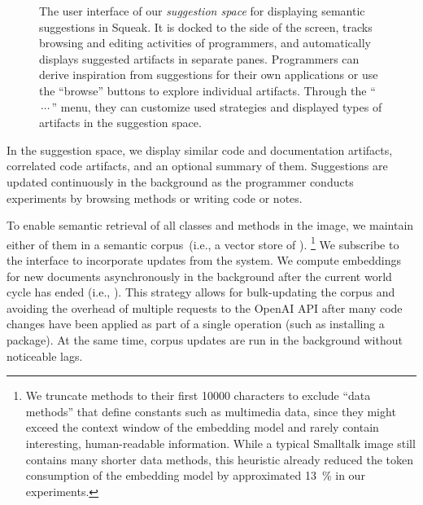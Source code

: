 \begin{figure}
	\caption[The user interface of our \emph{suggestion space} for displaying semantic suggestions in Squeak.]{
		The user interface of our \emph{suggestion space} for displaying semantic suggestions in Squeak.
		It is docked to the side of the screen, tracks browsing and editing activities of programmers, and automatically displays suggested artifacts in separate panes.
		Programmers can derive inspiration from suggestions for their own applications or use the ``browse'' buttons to explore individual artifacts.
		Through the ``$\,{\cdots}\,$'' menu, they can customize used strategies and displayed types of artifacts in the suggestion space.
	}
	\label{fig:implementation/suggestions/space}
\end{figure}

In the suggestion space, we display similar code and documentation artifacts, correlated code artifacts, and an optional summary of them.
Suggestions are updated continuously in the background as the programmer conducts experiments by browsing methods or writing code or notes.

To enable semantic retrieval of all classes and methods in the image, we maintain either of them in a semantic corpus~(i.e., a vector store of \semtex).
\footnote{We truncate methods to their first \num{10000} characters to exclude ``data methods'' that define constants such as multimedia data, since they might exceed the context window of the embedding model and rarely contain interesting, human-readable information. While a typical Smalltalk image still contains many shorter data methods, this heuristic already reduced the token consumption of the embedding model by approximated \qty{13}{\percent} in our experiments.}
We subscribe to the  interface to incorporate updates from the system.
We compute embeddings for new documents asynchronously in the background after the current world cycle has ended (i.e., ).
This strategy allows for bulk-updating the corpus and avoiding the overhead of multiple requests to the OpenAI API after many code changes have been applied as part of a single operation (such as installing a package).
At the same time, corpus updates are run in the background without noticeable lags.
